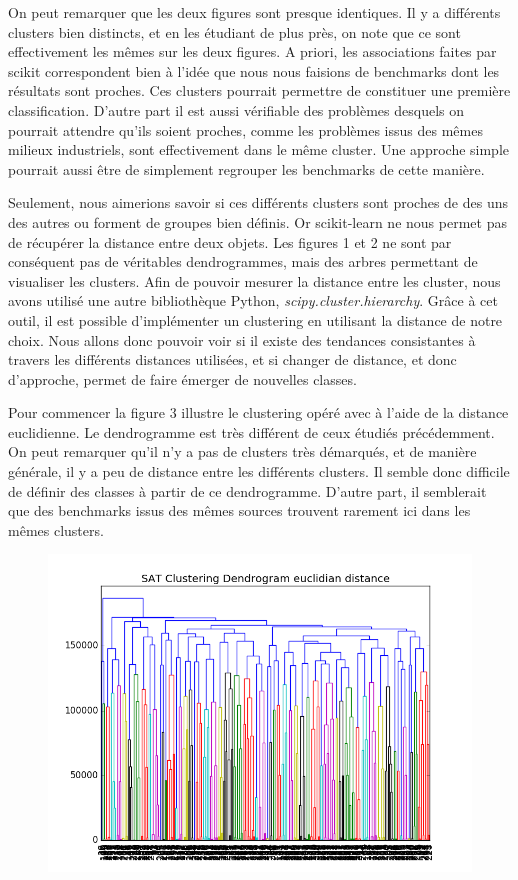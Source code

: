 \documentclass[a4paper,11pt]{article}
\begin{document}
On peut remarquer que les deux figures sont presque identiques. Il y a différents clusters bien distincts, et en les étudiant de plus près, on note que ce sont effectivement les mêmes sur les deux figures. 
A priori, les associations faites par scikit correspondent bien à l'idée 
que nous nous faisions de benchmarks dont les résultats sont proches. Ces clusters pourrait permettre de constituer une première classification.
D'autre part il est aussi vérifiable des problèmes desquels on pourrait attendre qu'ils soient proches, comme les problèmes issus des mêmes milieux industriels, sont effectivement dans le même cluster.
Une approche simple pourrait aussi être de simplement regrouper les benchmarks de cette manière.

Seulement, nous aimerions savoir si ces différents clusters sont proches de des uns des autres ou forment de groupes bien définis. Or scikit-learn ne nous permet pas de récupérer la distance entre deux objets. 
Les figures 1 et 2 ne sont par conséquent pas de véritables dendrogrammes, mais des arbres permettant de visualiser les clusters. Afin de pouvoir mesurer la distance entre les cluster, nous avons utilisé une 
autre bibliothèque Python, \textit{scipy.cluster.hierarchy}. Grâce à cet outil, il est possible d'implémenter un clustering en utilisant la distance de notre choix. Nous allons donc pouvoir voir si il existe 
des  tendances consistantes à travers les différents distances utilisées, et si changer de distance, et donc d'approche, permet de faire émerger de nouvelles classes.

Pour commencer la figure 3 illustre le clustering opéré avec à l'aide de la distance euclidienne. Le dendrogramme est très différent de ceux étudiés précédemment. On peut remarquer qu'il n'y a pas de clusters 
très démarqués, et de manière générale, il y a peu de distance entre les différents clusters. Il semble donc difficile de définir des classes à partir de ce dendrogramme. D'autre part, il semblerait que des 
benchmarks issus des mêmes sources trouvent rarement ici dans les mêmes clusters. 

\begin{figure}
  \centering
  \caption{}
  \includegraphics[scale=0.50]{../Pictures/SAT_Clustering_Dendrogram_euclidian_distance.png}
\end{figure}
\end{document}
